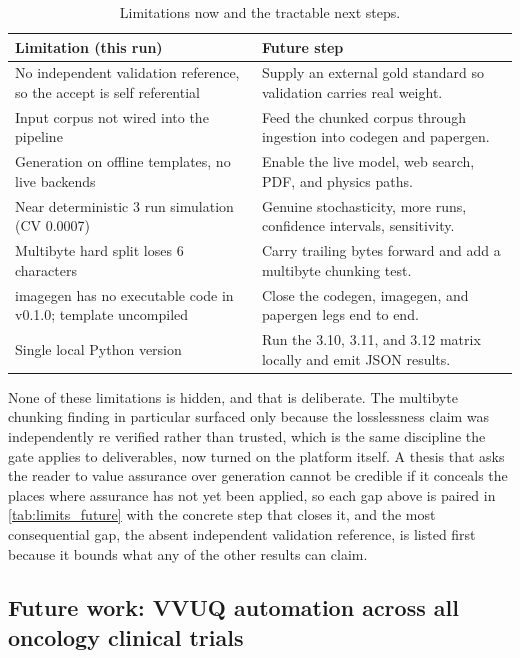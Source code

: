 \begin{table}[H]
\caption{Limitations now and the tractable next steps.}
\label{tab:limits_future}
\centering
\begin{tabularx}{\textwidth}{L{6.2cm} >{\raggedright\arraybackslash}X}
\toprule
\textbf{Limitation (this run)} & \textbf{Future step} \\
\midrule
  No independent validation reference, so the accept is self referential & Supply an external gold standard so validation carries real weight. \\
  Input corpus not wired into the pipeline & Feed the chunked corpus through ingestion into codegen and papergen. \\
  Generation on offline templates, no live backends & Enable the live model, web search, PDF, and physics paths. \\
  Near deterministic 3 run simulation (CV 0.0007) & Genuine stochasticity, more runs, confidence intervals, sensitivity. \\
  Multibyte hard split loses 6 characters & Carry trailing bytes forward and add a multibyte chunking test. \\
  imagegen has no executable code in v0.1.0; template uncompiled & Close the codegen, imagegen, and papergen legs end to end. \\
  Single local Python version & Run the 3.10, 3.11, and 3.12 matrix locally and emit JSON results. \\
\bottomrule
\end{tabularx}
\end{table}

None of these limitations is hidden, and that is deliberate. The multibyte
chunking finding in particular surfaced only because the losslessness claim was
independently re verified rather than trusted, which is the same discipline the
gate applies to deliverables, now turned on the platform itself. A thesis that
asks the reader to value assurance over generation cannot be credible if it
conceals the places where assurance has not yet been applied, so each gap above
is paired in \autoref{tab:limits_future} with the concrete step that closes it,
and the most consequential gap, the absent independent validation reference, is
listed first because it bounds what any of the other results can claim.

\subsection{Future work: VVUQ automation across all oncology clinical trials}

